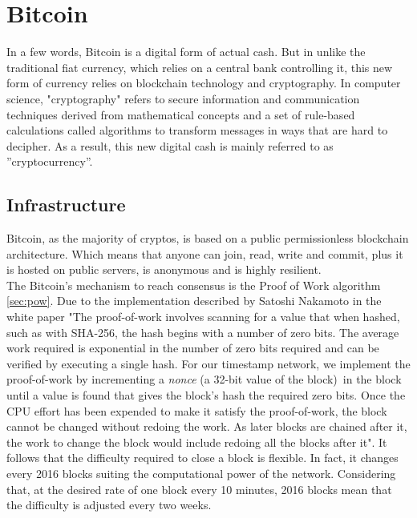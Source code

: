 \chapter{Bitcoin}
\label{cha:bitcoin}

In a few words, Bitcoin is a digital form of actual cash. But in unlike the 
traditional fiat currency, which relies on a central bank controlling it, this new
form of currency relies on blockchain technology and cryptography. 
In computer science, "cryptography" refers to secure information and communication 
techniques derived from mathematical concepts and a set of rule-based calculations 
called algorithms to transform messages in ways that are hard to decipher.
As a result, this new digital cash is mainly referred to as ''cryptocurrency''.

\section{Infrastructure}
\label{sec:Infrastructure}

Bitcoin, as the majority of cryptos, is based on a public permissionless blockchain architecture.
Which means that anyone can join, read, write and commit, plus it is hosted on public 
servers, is anonymous and is highly resilient. \\
The Bitcoin's mechanism to reach consensus is the Proof of Work algorithm \ref{sec:pow}.
Due to the implementation described by Satoshi Nakamoto in the white paper "The proof-of-work 
involves scanning for a value that when hashed, such as with SHA-256, the hash begins 
with a number of zero bits. The average work required is exponential in the number of 
zero bits required and can be verified by executing a single hash. For our timestamp 
network, we implement the proof-of-work by incrementing a \textit{nonce} (a 32-bit value of the block)\ in the block until a 
value is found that gives the block's hash the required zero bits.   
Once the CPU effort   has   been   expended   to   make   it   satisfy   the   
proof-of-work,   the   block   cannot   be   changed without  redoing  the   work.    
As   later   blocks   are  chained   after  it,   the  work  to  change  the  
block would include redoing all the blocks after it"\cite{bitcoin}. It follows 
that the difficulty required to close a block is flexible. In fact, it changes every 
2016 blocks suiting the computational power of the network. Considering that, at the 
desired rate of one block every 10 minutes, 2016
blocks mean that the difficulty is adjusted every two weeks.

